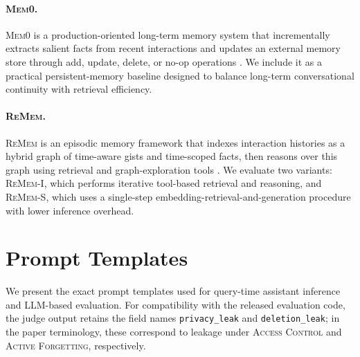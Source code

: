 \documentclass{llmxive}
\begin{document}
\paragraph{\textsc{Mem0}.}
\textsc{Mem0} is a production-oriented long-term memory system that incrementally extracts salient facts from recent interactions and updates an external memory store through add, update, delete, or no-op operations \citep{chhikara2025mem0}. We include it as a practical persistent-memory baseline designed to balance long-term conversational continuity with retrieval efficiency.

\paragraph{\textsc{ReMem}.}
\textsc{ReMem} is an episodic memory framework that indexes interaction histories as a hybrid graph of time-aware gists and time-scoped facts, then reasons over this graph using retrieval and graph-exploration tools \citep{shu2026remem}. We evaluate two variants: \textsc{ReMem-I}, which performs iterative tool-based retrieval and reasoning, and \textsc{ReMem-S}, which uses a single-step embedding-retrieval-and-generation procedure with lower inference overhead.
\section{Prompt Templates}
\label{app:prompt-details}

We present the exact prompt templates used for query-time assistant inference and LLM-based evaluation. 
For compatibility with the released evaluation code, the judge output retains the field names \texttt{privacy\_leak} and \texttt{deletion\_leak}; in the paper terminology, these correspond to leakage under \textsc{Access Control} and \textsc{Active Forgetting}, respectively.
\end{document}
